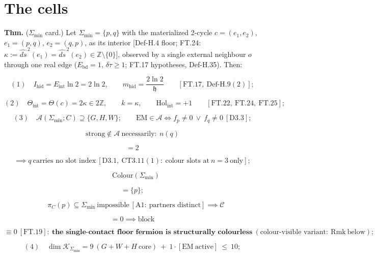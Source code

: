 \section[The cells]{\texorpdfstring{The cells}{The cells}}

\begin{theorem}\label{tag:FT-28}
\textbf{Thm.} ($\Sigma_{\min}$ card.) Let $\Sigma_{\min}=\{p,q\}$ with the materialized 2-cycle $c=(e_1,e_2)$, $e_1=(p,q)$, $e_2=(q,p)$, as its interior [Def-H.4 floor; FT.24: $\kappa:=\widehat{ds}^{\,2}(e_1)=\widehat{ds}^{\,2}(e_2)\in\mathbb Z\setminus\{0\}$], observed by a single external neighbour $o$ through one real edge ($E_{\mathrm{bd}}=1$, $\delta\tau\ge1$; FT.17 hypotheses, Def-H.35). Then:

\[
(1)\quad I_{\mathrm{hid}}=E_{\mathrm{int}}\ln2=2\ln2,\qquad m_{\mathrm{hid}}=\frac{2\ln2}{\mathfrak h}\qquad[\mathrm{FT.17},\ \mathrm{Def\text{-}H.9}(2)];
\]

\[
(2)\quad\Theta_{\mathrm{int}}=\Theta(c)=2\kappa\in2\mathbb Z,\qquad k=\kappa,\qquad\mathrm{Hol}_{\mathrm{int}}=+1\qquad[\mathrm{FT.22},\ \mathrm{FT.24},\ \mathrm{FT.25}];
\]

\[
(3)\quad\mathcal A(\Sigma_{\min};C)\supseteq\{G,H,W\};\qquad\mathrm{EM}\in\mathcal A\iff f_p\ne0\ \vee\ f_q\ne0\ [\mathrm{D3.3}];
\]

\[
\text{strong}\notin\mathcal A\ \text{necessarily}:\ n(q)
\]

\[
= 2
\]

\[
\implies q\ \text{carries no slot index}\ [\mathrm{D3.1},\ \mathrm{CT3.11}(1):\ \text{colour slots at}\ n{=}3\ \text{only}];
\]

\[
\quad\mathrm{Colour}(\Sigma_{\min})
\]

\[
= \{p\};
\]

\[
\quad\pi_C(p)\subseteq\Sigma_{\min}\ \text{impossible}\ [\mathrm{A1}:\ \text{partners distinct}]\implies\mathcal C
\]

\[
= 0\implies\text{block}
\]

\[
\equiv 0\ [\mathrm{FT.19}]:\ \textbf{the single-contact floor fermion is structurally colourless}\ (\text{colour-visible variant}:\ \mathrm{Rmk}\ \text{below});
\]

\[
(4)\quad\dim\mathcal K_{\Sigma_{\min}}=9\ (G{+}W{+}H\ \text{core})\ +\ 1\cdot[\mathrm{EM}\ \text{active}]\ \le\ 10;
\]


\end{theorem}
